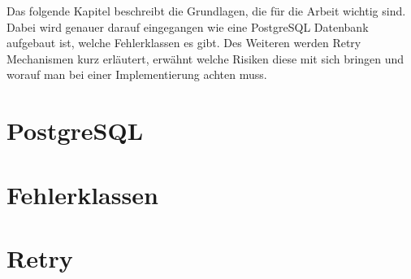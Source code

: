 
Das folgende Kapitel beschreibt die Grundlagen, die für die Arbeit wichtig sind.
Dabei wird genauer darauf eingegangen wie eine PostgreSQL Datenbank aufgebaut ist, welche Fehlerklassen es gibt.
Des Weiteren werden Retry Mechanismen kurz erläutert, erwähnt welche Risiken diese mit sich bringen und worauf man
bei einer Implementierung achten muss.

\section{PostgreSQL}
\label{sec:postgresql}


\section{Fehlerklassen}
\label{sec:errorclasses}


\section{Retry}
\label{sec:retry}
